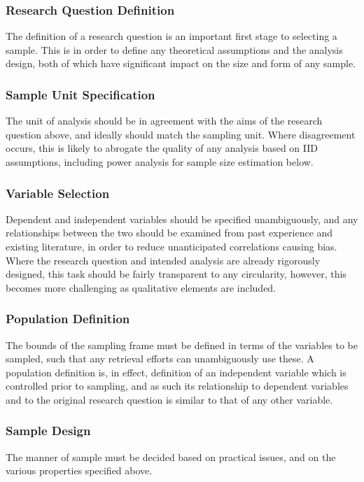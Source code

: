 \subsubsection{Research Question Definition}
The definition of a research question is an important first stage to selecting a sample.  This is in order to define any theoretical assumptions and the analysis design, both of which have significant impact on the size and form of any sample.

\subsubsection{Sample Unit Specification}
The unit of analysis should be in agreement with the aims of the research question above, and ideally should match the sampling unit.  Where disagreement occurs, this is likely to abrogate the quality of any analysis based on IID assumptions, including power analysis for sample size estimation below.

\subsubsection{Variable Selection}
Dependent and independent variables should be specified unambiguously, and any relationships between the two should be examined from past experience and existing literature, in order to reduce unanticipated correlations causing bias.  Where the research question and intended analysis are already rigorously designed, this task should be fairly transparent to any circularity, however, this becomes more challenging as qualitative elements are included.

\subsubsection{Population Definition}
The bounds of the sampling frame must be defined in terms of the variables to be sampled, such that any retrieval efforts can unambiguously use these.  A population definition is, in effect, definition of an independent variable which is controlled prior to sampling, and as such its relationship to dependent variables and to the original research question is similar to that of any other variable.

\subsubsection{Sample Design}
The manner of sample must be decided based on practical issues, and on the various properties specified above.

